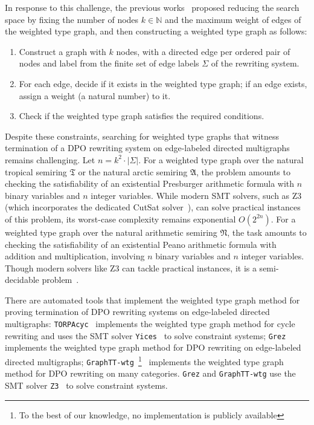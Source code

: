     In response to this challenge, the previous works~\cite{zantema2014termination,bruggink2014termination,bruggink2015proving} proposed reducing the search space by fixing the number of nodes \( k \in \mathbb{N} \) and the maximum weight of edges of the weighted type graph, and then constructing a weighted type graph as follows: 
    \begin{enumerate}
      \item Construct a graph with \( k \) nodes, with a directed edge per ordered pair of nodes and label from the finite set of edge labels $\Sigma$ of the rewriting system. 
      \item For each edge, decide if it exists in the weighted type graph;  if an edge exists, assign a weight (a natural number) to it.
      \item Check if the weighted type graph satisfies the required conditions.
    \end{enumerate}
    Despite these constraints, searching for weighted type graphs that witness termination of a DPO rewriting system on edge-labeled directed multigraphs
    remains challenging. 
    Let $n = k^2 \cdot | \Sigma |$.
    For a weighted type graph over the natural tropical semiring $\mathfrak{T}$ or the natural arctic semiring $\mathfrak{A}$, the problem amounts to
    checking the satisfiability of an existential Presburger arithmetic formula with $n$ binary variables and $n$ integer variables.
    While modern SMT solvers, such as Z3~\cite{arithmetic2024z3} (which incorporates the dedicated CutSat solver~\cite{z3ilp_cutsat}), can solve practical instances of this problem, its worst-case complexity remains exponential \( O(2^{2n}) \).
     For a weighted type graph over the natural arithmetic semiring $\mathfrak{N}$, the task amounts to
     checking the satisfiability of an existential Peano arithmetic formula with addition and multiplication, involving $n$ binary variables and $n$ integer variables. Though modern solvers like Z3 can tackle practical instances, it is a semi-decidable problem~\cite{matiyasevivc2003enumerable}.

    There are automated tools that implement the weighted type graph method for proving termination of DPO rewriting systems on edge-labeled directed multigraphs:  
    \texttt{TORPAcyc}~\cite{TORPAcyc} implements the weighted type graph method for cycle rewriting and uses the SMT solver \texttt{Yices}~\cite{yices} to solve constraint systems;
    \texttt{Grez}~\cite{grez} implements the weighted type graph method for DPO rewriting on edge-labeled directed multigraphs; \texttt{GraphTT-wtg}~\footnote{To the best of our knowledge, no implementation is publicly available}~\cite{endrullis2024generalized_arxiv_v3} implements the weighted type graph method for DPO rewriting on many categories.
    \texttt{Grez} and \texttt{GraphTT-wtg}  
    use  the SMT solver \texttt{Z3}~\cite{de2008z3} to solve constraint systems.

